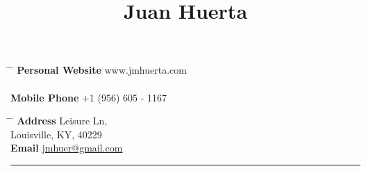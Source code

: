 \documentclass[10pt]{article} %
\begin{document}
\pagestyle{fancy}

\title{Juan Huerta } %


\parbox{0.5\textwidth}{ %
\begin{tabbing} %
\hspace{3cm} \= \hspace{4cm} \= \kill %
{\bf Personal Website} \>  www.jmhuerta.com \\ %
\\
{\bf Mobile Phone} \> +1 (956) 605 - 1167 \\ %

\end{tabbing}}
\hfill %
\parbox{0.5\textwidth}{ %
\begin{tabbing} %
\hspace{3cm} \= \hspace{4cm} \= \kill %
{\bf Address}  Leisure Ln,\\ %
\> Louisville, KY, 40229 \\ %
{\bf Email} \> \href{mailto:jmhuer@gmail.com}{jmhuer@gmail.com} \\ %
\end{tabbing}}



\noindent\rule{1cm}{0.4pt}
\end{document}
